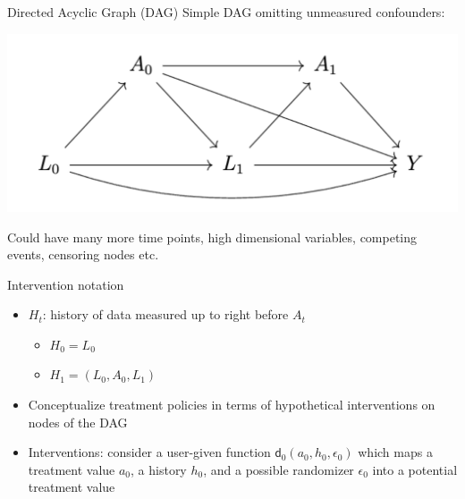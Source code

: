 \documentclass[
  10pt,
  ignorenonframetext,
]{beamer}
\providecommand{\tightlist}{%
  \setlength{\itemsep}{0pt}\setlength{\parskip}{0pt}}\usepackage{longtable,booktabs,array}
\begin{document}
\begin{frame}{Directed Acyclic Graph (DAG)}
\protect\hypertarget{directed-acyclic-graph-dag}{}
Simple DAG omitting unmeasured confounders:

\includegraphics{img/dag.png}

Could have many more time points, high dimensional variables, competing
events, censoring nodes etc.
\end{frame}

\begin{frame}{Intervention notation}
\protect\hypertarget{intervention-notation}{}
\begin{itemize}
\item
  \(H_t\): history of data measured up to right before \(A_t\)

  \begin{itemize}
  \tightlist
  \item
    \(H_0=L_0\)
  \item
    \(H_1 = (L_0, A_0, L_1)\)
  \end{itemize}
\item
  Conceptualize treatment policies in terms of hypothetical
  interventions on nodes of the DAG
\item
  Interventions: consider a user-given function
  \(\mathsf{d}_0(a_0, h_0, \epsilon_0)\) which maps a treatment value
  \(a_0\), a history \(h_0\), and a possible randomizer \(\epsilon_0\)
  into a potential treatment value
\end{itemize}
\end{frame}
\end{document}
